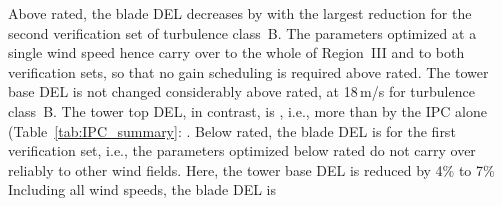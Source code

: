 

Above rated, the blade DEL decreases by  with the largest reduction for the second verification set of turbulence class~B. The parameters optimized at a single wind speed hence carry over to the whole of Region~III and to both verification sets, so that no gain scheduling is required above rated. The tower base DEL is not changed considerably above rated,  at 18\,m/s for turbulence class~B. The tower top DEL, in contrast, is , i.e., more than by the IPC alone (Table~\ref{tab:IPC_summary}: . Below rated, the blade DEL is  for the first verification set, i.e., the parameters optimized below rated do not carry over reliably to other wind fields. Here, the tower base DEL is reduced by 4\% to 7\%  Including all wind speeds, the blade DEL is 

